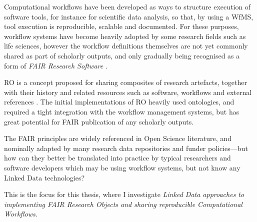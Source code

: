 Computational \glspl{workflow} have been developed as ways to structure execution of software tools, for instance for scientific data analysis, so that, by using a \gls{WfMS}, tool execution is reproducible, scalable and documented. For these purposes, workflow systems have become heavily adopted by some research fields such as life sciences, however the workflow definitions themselves are not yet commonly shared as part of scholarly outputs, and only gradually being recognised as a form of \emph{FAIR Research Software} \cite{Katz 2021b}. 

\acrfull{RO} is a concept proposed for sharing composites of research artefacts, together with their history and related resources such as software, workflows and external references \cite{Bechhofer 2013}. The initial implementations of RO heavily used ontologies, and required a tight integration with the workflow management systems, but has great potential for FAIR publication of any scholarly outputs.
 
The FAIR principles are widely referenced in Open Science literature, and nominally adapted by many research data repositories and funder policies---but how can they better be translated into practice by typical researchers and software developers which may be using workflow systems, but not know any Linked Data technologies? 

This is the focus for this thesis, where I investigate \emph{Linked Data approaches to implementing FAIR Research Objects and sharing reproducible Computational Workflows}.


